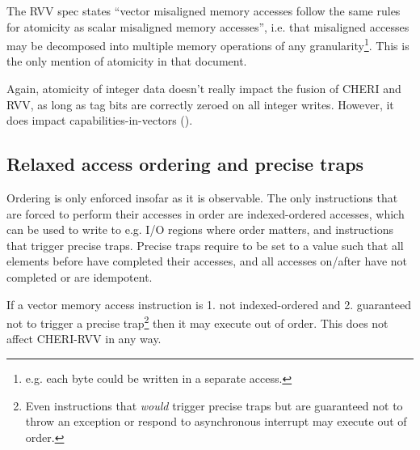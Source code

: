 The RVV spec states \enquote{vector misaligned memory accesses follow the same rules for atomicity as scalar misaligned memory accesses}, i.e. that misaligned accesses may be decomposed into multiple memory operations of any granularity\footnote{e.g. each byte could be written in a separate access.}.
This is the only mention of atomicity in that document.

Again, atomicity of integer data doesn't really impact the fusion of CHERI and RVV, as long as tag bits are correctly zeroed on all integer writes.
However, it does impact capabilities-in-vectors (\todoref{}).

\subsection{Relaxed access ordering and precise traps}
Ordering is only enforced insofar as it is observable.
The only instructions that are forced to perform their accesses in order are indexed-ordered accesses, which can be used to write to e.g. I/O regions where order matters, and instructions that trigger precise traps.
Precise traps require  to be set to a value such that all elements before  have completed their accesses, and all accesses on/after  have not completed or are idempotent.

If a vector memory access instruction is 1. not indexed-ordered and 2. guaranteed not to trigger a precise trap\footnote{Even instructions that \emph{would} trigger precise traps but are guaranteed not to throw an exception or respond to asynchronous interrupt may execute out of order.} then it may execute out of order.
This does not affect CHERI-RVV in any way.